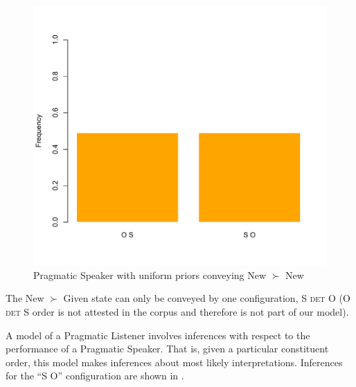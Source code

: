 \documentclass[output=paper,modfonts,nonflat]{langsci/langscibook}
\begin{document}
\begin{figure}
\includegraphics[scale = 0.45]{figures/plotPragmaticSpeakerNewNewUniform}
\caption{Pragmatic Speaker with uniform priors conveying New $\succ$ New}\label{figure:uniform4}
\end{figure}

The New $\succ$ Given state can only be conveyed by one configuration, S {\scshape det} O (O {\scshape det} S order is not attested in the corpus and therefore is not part of our model).

A model of a Pragmatic Listener involves inferences with respect to the performance of a Pragmatic Speaker. That is, given a particular constituent order, this model makes inferences about most likely interpretations. Inferences for the ``S O'' configuration are shown in  .
\end{document}
